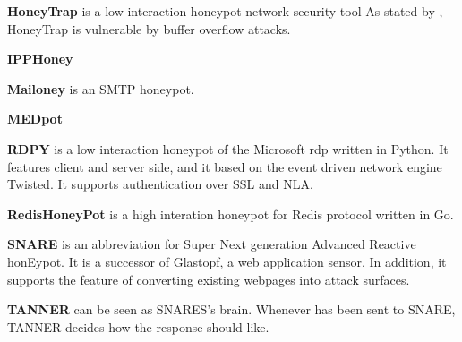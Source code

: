 \textbf{HoneyTrap} \cite{honeytrap2021} is a low interaction honeypot network security tool
As stated by \citet*{honeytrap2021}, HoneyTrap is vulnerable by buffer overflow attacks.

\textbf{IPPHoney} \cite{ipphoney2021}

\textbf{Mailoney} is an SMTP honeypot.

\textbf{MEDpot} \cite{medpot2021}

\textbf{RDPY} \cite{rdpy2021} is a low interaction honeypot of the Microsoft \ac{rdp} written in Python.
It features client and server side, and it based on the event driven network engine Twisted.
It supports authentication over SSL and NLA.

\textbf{RedisHoneyPot} is a high interation honeypot for Redis protocol written in Go.

\textbf{SNARE} \cite{snare2021} is an abbreviation for Super Next generation Advanced Reactive honEypot.
It is a successor of Glastopf, a web application sensor.
In addition, it supports the feature of converting existing webpages into attack surfaces.

\textbf{TANNER} \cite{tanner2021} can be seen as SNARES's brain.
Whenever has been sent to SNARE, TANNER decides how the response should like.


